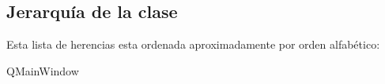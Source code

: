 \subsection{Jerarquía de la clase}
Esta lista de herencias esta ordenada aproximadamente por orden alfabético\-:\begin{DoxyCompactList}
\item {}
\item {}
\item {}
\item Q\-Main\-Window\begin{DoxyCompactList}
\item {}
\end{DoxyCompactList}
\end{DoxyCompactList}
